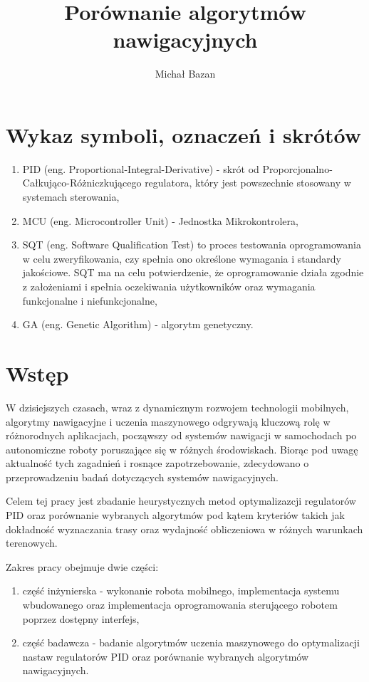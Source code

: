 \documentclass[12pt,twoside]{article}
\author{Michał Bazan}
\title{Porównanie algorytmów nawigacyjnych}
\begin{document}
\maketitle

\blankpage

\tableofcontents

\clearpage
\blankpage


\section*{Wykaz symboli, oznaczeń i skrótów}
\begin{enumerate}[label=\alph*), leftmargin=1.25cm]
	\item PID (eng. Proportional-Integral-Derivative) - skrót od Proporcjonalno-Całkująco-Różniczkującego regulatora, który jest powszechnie stosowany w systemach sterowania,
	\item MCU (eng. Microcontroller Unit) - Jednostka Mikrokontrolera,
	\item SQT (eng. Software Qualification Test) to proces testowania oprogramowania w celu zweryfikowania, czy spełnia ono określone wymagania i standardy jakościowe. SQT ma na celu potwierdzenie, że oprogramowanie działa zgodnie z założeniami i spełnia oczekiwania użytkowników oraz wymagania funkcjonalne i niefunkcjonalne,
	\item GA (eng. Genetic Algorithm) - algorytm genetyczny.
\end{enumerate}

\section{Wstęp}
W dzisiejszych czasach, wraz z dynamicznym rozwojem technologii mobilnych, algorytmy nawigacyjne i uczenia maszynowego \cite{deepLearning} odgrywają kluczową rolę w różnorodnych aplikacjach, począwszy od systemów nawigacji w samochodach po autonomiczne roboty poruszające się w różnych środowiskach. Biorąc pod uwagę aktualność tych zagadnień i rosnące zapotrzebowanie, zdecydowano o przeprowadzeniu badań dotyczących systemów nawigacyjnych.
   
Celem tej pracy jest zbadanie heurystycznych metod \cite{genetics} optymalizazcji regulatorów PID oraz porównanie wybranych algorytmów pod kątem kryteriów takich jak dokładność wyznaczania trasy oraz wydajność obliczeniowa w różnych warunkach terenowych.  

Zakres pracy obejmuje dwie części:
\begin{enumerate}[label=\alph*), leftmargin=1.25cm]
	\item część inżynierska - wykonanie robota mobilnego, implementacja systemu wbudowanego oraz implementacja oprogramowania sterującego robotem poprzez dostępny interfejs,
	\item część badawcza - badanie algorytmów uczenia maszynowego do optymalizacji nastaw regulatorów PID oraz porównanie wybranych algorytmów nawigacyjnych. 
\end{enumerate}
\end{document}
